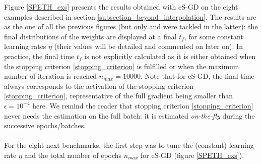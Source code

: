 \documentclass[article,authoryear,jmlmc]{beg_32}             %
\begin{document}
Figure \ref{SPETH_exs} presents the results obtained with eS-GD on the eight examples described in section \ref{subsection_beyond_interpolation}. 
The results are  as the one of all the previous figures (but only \exOne and \exTwo were tackled in the latter): the final distributions of the weights are
displayed at a final $t_f$, for some constant learning rates $\eta$ (their values will be detailed and commented on later on).  
In practice, the final time $t_f$ is not explicitly calculated as it is either obtained when the stopping criterion \eqref{stopping_criterion} is fulfilled or when the maximum number of iteration is reached
$n_{max} = 10000$.  
Note that for eS-GD, the final time always corresponds to the activation of the stopping criterion \eqref{stopping_criterion}, representative of the full gradient being smaller than $\epsilon =
10^{-4}$ here. We remind the reader that stopping criterion \eqref{stopping_criterion} never needs the estimation on the full batch: it is estimated {\em on-the-fly} during the successive
epochs/batches.  
\ \\ \ \\
For the eight next benchmarks, the first step was to tune the (constant) learning rate $\eta$ and the total number of epochs $n_{max}$ for eS-GD (figure \ref{SPETH_exs}). 
\end{document}
